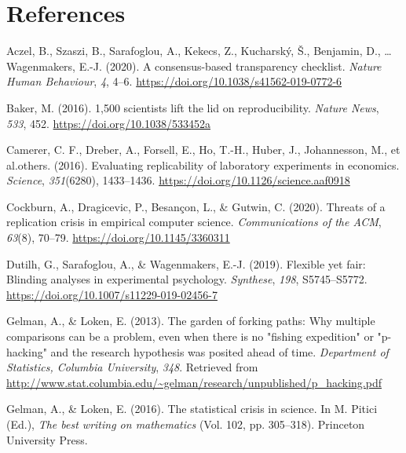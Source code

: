 \documentclass[
  english,
  man,floatsintext]{apa6}
\newlength{\cslhangindent}
\newenvironment{CSLReferences}[2] %
 {\begin{list}{}{%
  \setlength{\itemindent}{0pt}
  \setlength{\leftmargin}{0pt}
  \setlength{\parsep}{0pt}
  \ifodd #1
   \setlength{\leftmargin}{\cslhangindent}
   \setlength{\itemindent}{-1\cslhangindent}
  \fi
  \setlength{\itemsep}{#2\baselineskip}}}
 {\end{list}}
\begin{document}
\section*{References}\label{references}

\label{refs}
\begin{CSLReferences}{1}{0}
Aczel, B., Szaszi, B., Sarafoglou, A., Kekecs, Z., Kucharský, Š., Benjamin, D., \ldots{} Wagenmakers, E.-J. (2020). A consensus-based transparency checklist. \emph{Nature Human Behaviour}, \emph{4}, 4--6. \url{https://doi.org/10.1038/s41562-019-0772-6}

Baker, M. (2016). 1,500 scientists lift the lid on reproducibility. \emph{Nature News}, \emph{533}, 452. \url{https://doi.org/10.1038/533452a}

Camerer, C. F., Dreber, A., Forsell, E., Ho, T.-H., Huber, J., Johannesson, M., et al.others. (2016). Evaluating replicability of laboratory experiments in economics. \emph{Science}, \emph{351}(6280), 1433--1436. \url{https://doi.org/10.1126/science.aaf0918}

Cockburn, A., Dragicevic, P., Besançon, L., \& Gutwin, C. (2020). Threats of a replication crisis in empirical computer science. \emph{Communications of the ACM}, \emph{63}(8), 70--79. \url{https://doi.org/10.1145/3360311}

Dutilh, G., Sarafoglou, A., \& Wagenmakers, E.-J. (2019). Flexible yet fair: {B}linding analyses in experimental psychology. \emph{Synthese}, \emph{198}, S5745--S5772. \url{https://doi.org/10.1007/s11229-019-02456-7}

Gelman, A., \& Loken, E. (2013). The garden of forking paths: {W}hy multiple comparisons can be a problem, even when there is no "fishing expedition" or "p-hacking" and the research hypothesis was posited ahead of time. \emph{Department of Statistics, Columbia University}, \emph{348}. Retrieved from \url{http://www.stat.columbia.edu/~gelman/research/unpublished/p_hacking.pdf}

Gelman, A., \& Loken, E. (2016). The statistical crisis in science. In M. Pitici (Ed.), \emph{The best writing on mathematics} (Vol. 102, pp. 305--318). Princeton University Press.


\end{CSLReferences}
\end{document}
